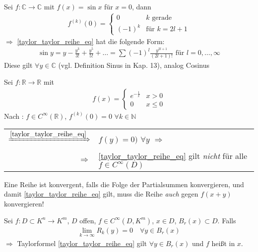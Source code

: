 \begin{example}
	Sei $f:\mathbb{C}\to\mathbb{C}$ mit $f(x) = \sin x$ für $x = 0$, dann \begin{align*}
		f^{(k)}(0) = \begin{cases}
			0& \text{$k$ gerade} \\
			(-1)^k & \text{für $k=2l + 1$}
		\end{cases}
	\end{align*}
	$\Rightarrow$ \eqref{taylor_taylor_reihe_eq} hat die folgende Form:\begin{align*}
		\sin y = y - \frac{y^3}{3!} + \frac{y^5}{5!} + \dotsc = \sum(-1)^l \frac{y^{2l+1}}{(2l+1)!} \text{ für }l = 0,\dotsc,\infty
	\end{align*}
	Diese gilt $\forall y\in\mathbb{C}$ (vgl. Definition Sinus in Kap. 13), analog Cosinus
\end{example}

\begin{example}
	Sei $f:\mathbb{R}\to\mathbb{R}$ mit \begin{align*}
		f(x) = \begin{cases}
			e^{-\frac{1}{x}} & x> 0 \\
			0 & x\le 0
		\end{cases}
	\end{align*}
	Nach : $f\in C^\infty(\mathbb{R})$, $f^{(k)}(0) = 0$ $\forall k\in \mathbb{N}$\\
	\begin{tabularx}{\linewidth}{r@{\ \ }X}
	$\xRightarrow{\eqref{taylor_taylor_reihe_eq}}$ & $f(y) = 0)$ $\forall y$ $\Rightarrow$ \Lightning \\
	$\Rightarrow$ & \eqref{taylor_taylor_reihe_eq} gilt \emph{nicht} für alle $f\in C^\infty(D)$
	\end{tabularx}
\end{example}

\begin{boldenvironment}[Wiedeholung]
	Eine Reihe ist konvergent, falls die Folge der Partialsummen konvergieren, und damit \eqref{taylor_taylor_reihe_eq} gilt, muss die Reihe \emph{auch} gegen $f(x+y)$ konvergieren!
\end{boldenvironment}

\begin{proposition}[Taylorreihe]
	Sei $f:D\subset K^n\to K^m$, $D$ offen, $f\in C^\infty(D, K^m)$, $x\in D$, $B_r(x)\subset D$. Falls \begin{align*}
		\lim\limits_{k\to\infty} R_k(y) = 0\quad\forall y\in B_r(x)
	\end{align*}
	$\Rightarrow$ Taylorformel \eqref{taylor_taylor_reihe_eq} gilt $\forall y\in B_r(x)$ und $f$ heißt  in $x$.
\end{proposition}

